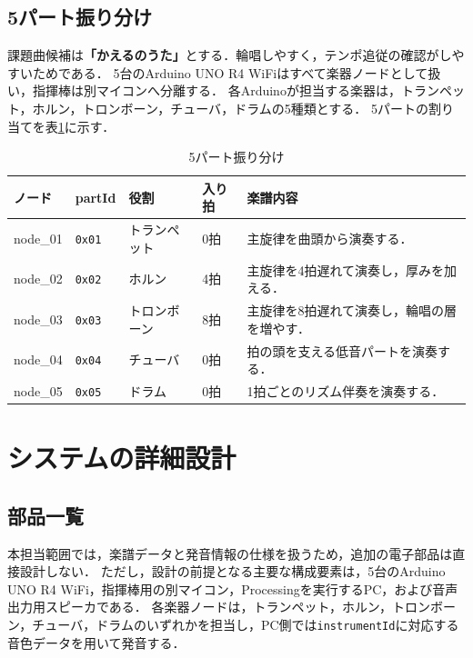 \documentclass[lualatex,book,paper=a4paper,jafontsize=11.5pt,jafontscale=1.05]{jlreq}
\newcommand{\code}[1]{\texttt{#1}}
\begin{document}
\section{5パート振り分け}

課題曲候補は\textbf{「かえるのうた」}とする．輪唱しやすく，テンポ追従の確認がしやすいためである．
5台のArduino UNO R4 WiFiはすべて楽器ノードとして扱い，指揮棒は別マイコンへ分離する．
各Arduinoが担当する楽器は，トランペット，ホルン，トロンボーン，チューバ，ドラムの5種類とする．
5パートの割り当てを表\ref{tab:saito-part-map}に示す．

\begin{table}[H]
\centering
\caption{5パート振り分け}
\label{tab:saito-part-map}
\begin{tabular}{p{}p{}p{}p{}p{}}
\toprule
\textbf{ノード} & \textbf{partId} & \textbf{役割} & \textbf{入り拍} & \textbf{楽譜内容} \\
\midrule
node\_01 & \code{0x01} & トランペット & 0拍 & 主旋律を曲頭から演奏する．\\
node\_02 & \code{0x02} & ホルン & 4拍 & 主旋律を4拍遅れて演奏し，厚みを加える．\\
node\_03 & \code{0x03} & トロンボーン & 8拍 & 主旋律を8拍遅れて演奏し，輪唱の層を増やす．\\
node\_04 & \code{0x04} & チューバ & 0拍 & 拍の頭を支える低音パートを演奏する．\\
node\_05 & \code{0x05} & ドラム & 0拍 & 1拍ごとのリズム伴奏を演奏する．\\
\bottomrule
\end{tabular}
\end{table}

\chapter{システムの詳細設計}\label{chap:saito-detail-design}

\section{部品一覧}
本担当範囲では，楽譜データと発音情報の仕様を扱うため，追加の電子部品は直接設計しない．
ただし，設計の前提となる主要な構成要素は，5台のArduino UNO R4 WiFi，指揮棒用の別マイコン，Processingを実行するPC，および音声出力用スピーカである．
各楽器ノードは，トランペット，ホルン，トロンボーン，チューバ，ドラムのいずれかを担当し，PC側では\code{instrumentId}に対応する音色データを用いて発音する．
\end{document}

